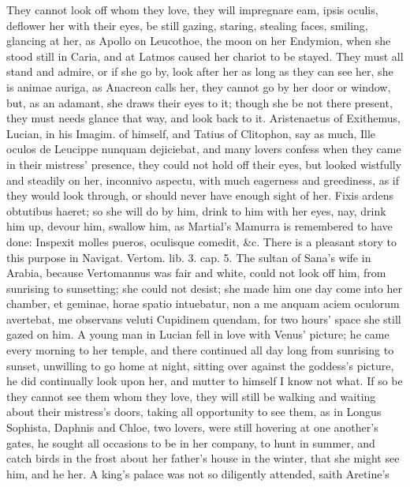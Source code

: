 {They cannot look off whom they love, they will impregnare eam, ipsis
oculis, deflower her with their eyes, be still gazing, staring,
stealing faces, smiling, glancing at her, as Apollo on Leucothoe,
the moon on her Endymion, when she stood still in Caria, and at
Latmos caused her chariot to be stayed. They must all stand and admire,
or if she go by, look after her as long as they can see her, she is
animae auriga, as Anacreon calls her, they cannot go by her door or
window, but, as an adamant, she draws their eyes to it; though she be
not there present, they must needs glance that way, and look back to
it. Aristenaetus of  Exithemus, Lucian, in his Imagim. of
himself, and Tatius of Clitophon, say as much, Ille oculos de Leucippe
nunquam dejiciebat, and many lovers confess when they came in
their mistress' presence, they could not hold off their eyes, but
looked wistfully and steadily on her, inconnivo aspectu, with much
eagerness and greediness, as if they would look through, or should
never have enough sight of her. Fixis ardens obtutibus haeret; so she
will do by him, drink to him with her eyes, nay, drink him up, devour
him, swallow him, as Martial's Mamurra is remembered to have done:
Inspexit molles pueros, oculisque comedit, \&c. There is a pleasant
story to this purpose in Navigat. Vertom. lib. 3. cap. 5. The sultan of
Sana's wife in Arabia, because Vertomannus was fair and white, could
not look off him, from sunrising to sunsetting; she could not desist;
she made him one day come into her chamber, et geminae, horae spatio
intuebatur, non a me anquam aciem oculorum avertebat, me observans
veluti Cupidinem quendam, for two hours' space she still gazed on him.
A young man in Lucian fell in love with Venus' picture; he came
every morning to her temple, and there continued all day long
from sunrising to sunset, unwilling to go home at night, sitting
over against the goddess's picture, he did continually look upon her,
and mutter to himself I know not what. If so be they cannot see them
whom they love, they will still be walking and waiting about their
mistress's doors, taking all opportunity to see them, as in
Longus Sophista, Daphnis and Chloe, two lovers, were still
hovering at one another's gates, he sought all occasions to be in her
company, to hunt in summer, and catch birds in the frost about her
father's house in the winter, that she might see him, and he her.
A king's palace was not so diligently attended, saith Aretine's
}
